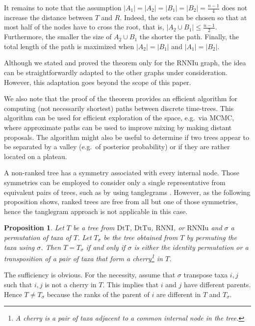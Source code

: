 \documentclass[11pt]{amsart}
\newtheorem{proposition}[lemma]{Proposition}
\theoremstyle{definition}
\newcommand{\rnni}{\mathrm{RNNI}}
\newcommand{\rnniu}{\mathrm{RNNIu}}
\newcommand{\dtt}{\mathrm{DtT}}
\newcommand{\dttu}{\mathrm{DtTu}}
\begin{document}
It remains to note that the assumption $|A_1| = |A_2| = |B_1| = |B_2| = \frac{n-1}{4}$ does not increase the distance between $T$ and $R$.
Indeed, the sets can be chosen so that at most half of the nodes have to cross the root, that is, $|A_2 \cup B_1| \le \frac{n-1}{2}$.
Furthermore, the smaller the size of $A_2 \cup B_1$ the shorter the path.
Finally, the total length of the path is maximized when $|A_2| = |B_1|$ and $|A_1| = |B_2|$.
\endproof

Although we stated and proved the theorem only for the $\rnniu$ graph, the idea can be straightforwardly adapted to the other graphs under consideration.
However, this adaptation goes beyond the scope of this paper.

We also note that the proof of the theorem provides an efficient algorithm for computing (not necessarily shortest) paths between discrete time-trees.
This algorithm can be used for efficient exploration of the space, e.g.\ via MCMC, where approximate paths can be used to improve mixing by making distant proposals.
The algorithm might also be useful to determine if two trees appear to be separated by a valley (e.g.\ of posterior probability) or if they are rather located on a plateau.

A non-ranked tree has a symmetry associated with every internal node.
Those symmetries can be employed to consider only a single representative from equivalent pairs of trees, such as by using tanglegrams \autocite{Matsen2015-fn, Whidden2015-es}.
However, as the following proposition shows, ranked trees are free from all but one of those symmetries, hence the tanglegram approach is not applicable in this case.

\begin{proposition}
Let $T$ be a tree from $\dtt$, $\dttu$, $\rnni$, or $\rnniu$ and $\sigma$ a permutation of taxa of $T$.
Let $T_\sigma$ be the tree obtained from $T$ by permuting the taxa using $\sigma$.
Then $T = T_\sigma$ if and only if $\sigma$ is either the identity permutation or a transposition of a pair of taxa that form a
cherry\footnote{A \emph{cherry} is a pair of taxa adjacent to a common internal node in the tree.}
in $T$.
\end{proposition}

\proof
The sufficiency is obvious.
For the necessity, assume that $\sigma$ transpose taxa $i,j$ such that $i,j$ is not a cherry in $T$.
This implies that $i$ and $j$ have different parents.
Hence $T \ne T_\sigma$ because the ranks of the parent of $i$ are different in $T$ and $T_\sigma$.
\endproof
\end{document}
